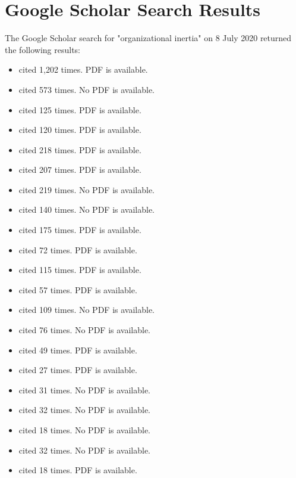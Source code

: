 \section{Google Scholar Search Results}
The Google Scholar search for "organizational inertia" on 8 July 2020 returned the following results:\\
\begin{itemize}
\item \cite{kelly1991organizational} cited 1,202 times. PDF is available.
\item \cite{dean1991integrated} cited 573 times. No PDF is available.
\item \cite{barnett2008red} cited 125 times. PDF is available.
\item \cite{geiger2009narratives} cited 120 times. PDF is available.
\item \cite{shimizu2005constrains} cited 218 times. PDF is available.
\item \cite{van1998bridging} cited 207 times. PDF is available.
\item \cite{snell1994strategic} cited 219 times. No PDF is available.
\item \cite{lazerson1999resisting} cited 140 times. No PDF is available.
\item \cite{dobrev2003shifting} cited 175 times. PDF is available.
\item \cite{godkin2008overcoming} cited 72 times. PDF is available.
\item \cite{larsen2002representing} cited 115 times. PDF is available.
\item \cite{boyer2006organizational} cited 57 times. PDF is available.
\item \cite{naslund2012appropriated} cited 109 times. No PDF is available.
\item \cite{dean1993determinants} cited 76 times. No PDF is available.
\item \cite{nedzinskas2013impact} cited 49 times. PDF is available.
\item \cite{hannan2002structural} cited 27 times. PDF is available.
\item \cite{lorenz1994organizational} cited 31 times. No PDF is available.
\item \cite{chiu2004hollowing} cited 32 times. No PDF is available.
\item \cite{allcorn2011workplace} cited 18 times. No PDF is available.
\item \cite{godkin2010zone} cited 32 times. No PDF is available.
\item \cite{bromley1992vested} cited 18 times. PDF is available.

\end{itemize}
